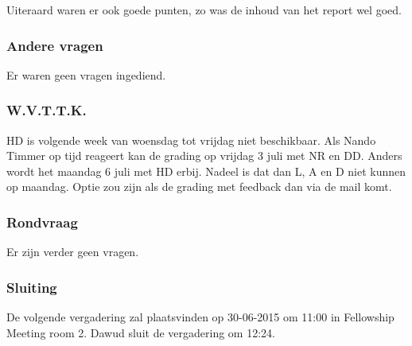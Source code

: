 Uiteraard waren er ook goede punten, zo was de inhoud van het report wel goed.


\subsubsection{Andere vragen}
Er waren geen vragen ingediend.

\subsubsection{W.V.T.T.K.}
HD is volgende week van woensdag tot vrijdag niet beschikbaar. Als Nando Timmer op tijd reageert kan de grading op vrijdag 3 juli met NR en DD. Anders wordt het maandag 6 juli met HD erbij. Nadeel is dat dan L, A en D niet kunnen op maandag. Optie zou zijn als de grading met feedback dan via de mail komt.

\subsubsection{Rondvraag}
Er zijn verder geen vragen.

\subsubsection{Sluiting}
De volgende vergadering zal plaatsvinden op 30-06-2015 om 11:00 in Fellowship Meeting room 2.
\newline\newline
Dawud sluit de vergadering om 12:24.
